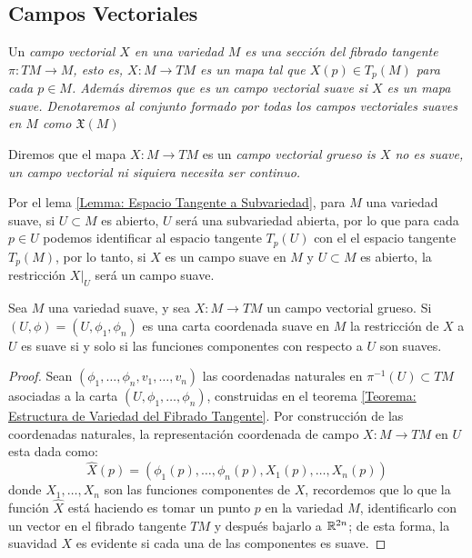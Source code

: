 \subsection{Campos Vectoriales}\label{Subsección: Campos Vectoriales}
\begin{definition}
	Un \it{campo vectorial} $X$ en una variedad $M$ es una sección del fibrado tangente $\pi: TM \to M$, esto es, $X: M \to TM$ es un mapa tal que $X(p) \in T_{p}(M)$ para cada $p \in M$. Además diremos que es un \it{campo vectorial suave} si $X$ es un mapa suave. Denotaremos al conjunto formado por todas los campos vectoriales suaves en $M$ como $\mathfrak{X}(M)$

	Diremos que el mapa $X: M \to TM$ es un \it{campo vectorial grueso} is $X$ no es suave, un campo vectorial ni siquiera necesita ser continuo.
\end{definition}

Por el lema \ref{Lemma: Espacio Tangente a Subvariedad}, para $M$ una variedad suave, si $U \subset M$ es abierto, $U$ será una subvariedad abierta, por lo que para cada $p \in U$ podemos identificar al espacio tangente $T_p(U)$ con el el espacio tangente $T_p(M)$, por lo tanto, si $X$ es un campo suave en $M$ y $U \subset M$ es abierto, la restricción $X|_{U}$ será un campo suave.

\begin{theorem}\label{Teorema: Primer Criterio de Suavidad Para Campos Vectoriales}
	Sea $M$ una variedad suave, y sea $X: M \to TM$ un campo vectorial grueso. Si $(U,\phi) = (U,\phi_1,\phi_n)$ es una carta coordenada suave en $M$ la restricción de $X$ a $U$ es suave si y solo si las funciones componentes con respecto a $U$ son suaves.
\end{theorem}

\begin{proof}
	Sean $(\phi_1,\ldots,\phi_n, v_1, \ldots, v_n)$ las coordenadas naturales en $\pi^{-1}(U) \subset TM$ asociadas a la carta $(U,\phi_1,\ldots,\phi_n)$, construidas en el teorema \ref{Teorema: Estructura de Variedad del Fibrado Tangente}. Por construcción de las coordenadas naturales, la representación coordenada de campo $X: M \to TM$ en $U$ esta dada como:
	\[
		\hat{X}(p) = (\phi_1(p), \ldots, \phi_n(p), X_1(p), \ldots, X_n(p))
	\]
	donde $X_1, \ldots, X_n$ son las funciones componentes de $X$, recordemos que lo que la función $\hat{X}$ está haciendo es tomar un punto $p$ en la variedad $M$, identificarlo con un vector en el fibrado tangente $TM$ y después bajarlo a $\mathbb{R}^{2n}$; de esta forma, la suavidad $X$ es evidente si cada una de las componentes es suave.
\end{proof}

